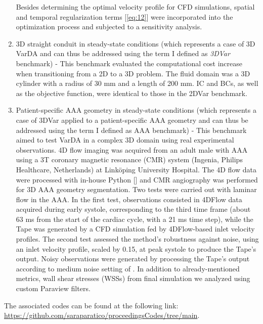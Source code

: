 \begin{enumerate}
Besides determining the optimal velocity profile for CFD simulations, spatial and temporal regularization terms [\cref{eq:12}] were incorporated into the optimization process and subjected to a sensitivity analysis.\\
    \item 3D straight conduit in steady-state conditions (which represents a case of 3D VarDA and can thus be addressed using the term I defined as \emph{3DVar} benchmark) - This benchmark evaluated the computational cost increase when transitioning from a 2D to a 3D problem. The fluid domain was a 3D cylinder with a radius of 30 mm and a length of 200 mm. IC and BCs, as well as the objective function, were identical to those in the 2DVar benchmark.\\
    \item Patient-specific AAA geometry in steady-state conditions (which represents a case of 3DVar applied to a patient-specific AAA geometry and can thus be addressed using the term I defined as AAA benchmark) - This benchmark aimed to test VarDA in a complex 3D domain using real experimental observations. 4D flow imaging was acquired from an adult male with AAA using a 3T coronary magnetic resonance (CMR) system (Ingenia, Philips Healthcare, Netherlands) at Linköping University Hospital. The 4D flow data were processed with in-house Python [\cite{Saitta2024}] and CMR angiography was performed for 3D AAA geometry segmentation.
Two tests were carried out with laminar flow in the AAA. In the first test, observations consisted in 4DFlow data acquired during early systole, corresponding to the third time frame (about 63 ms from the start of the cardiac cycle, with a 21 ms time step), while the Tape was generated by a CFD simulation fed by 4DFlow-based inlet velocity profiles. The second test assessed the method's robustness against noise, using an inlet velocity profile, scaled by 0.15, at peak systole to produce the Tape's output. Noisy observations were generated by processing the Tape's output according to medium noise setting of \cite{Saitta2024}.
In addition to already-mentioned metrics, wall shear stresses (WSSs) from final simulation we analyzed using custom Paraview filters.
\end{enumerate}

The associated codes can be found at the following link:
\url{https://github.com/saraparatico/proceedingsCodes/tree/main}.

